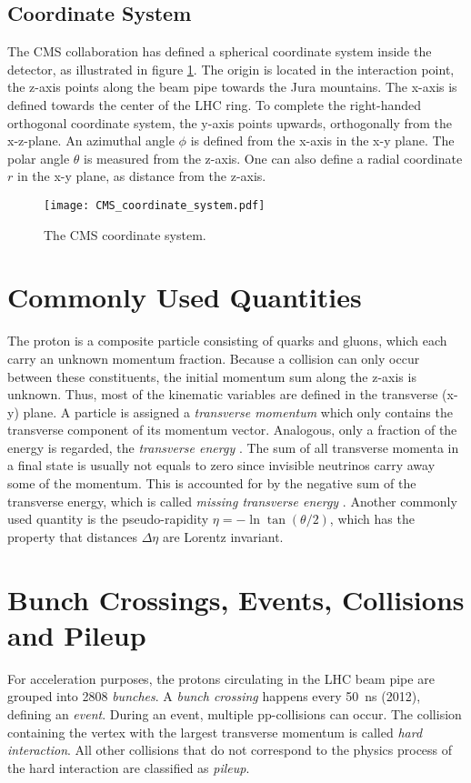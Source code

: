 \subsection{Coordinate System}
The CMS collaboration has defined a spherical coordinate system inside the detector, as illustrated in figure \ref{fig:cms_coordinate_system}. The origin is located in the interaction point, the z-axis points along the beam pipe towards the Jura mountains. The x-axis is defined towards the center of the LHC ring. To complete the right-handed orthogonal coordinate system, the y-axis points upwards, orthogonally from the x-z-plane. 
An azimuthal angle $\phi$ is defined from the x-axis in the x-y plane. The polar angle $\theta$ is measured from the z-axis. One can also define a radial coordinate $r$ in the x-y plane, as distance from the z-axis.\cite[p.~2]{Co2008CMS} 
\begin{figure}
	\centering
	\texttt{[image: CMS\_coordinate\_system.pdf]}
	\caption{The CMS coordinate system.}
	\label{fig:cms_coordinate_system}
\end{figure}

\section{Commonly Used Quantities}
The proton is a composite particle consisting of quarks and gluons, which each carry an unknown momentum fraction. Because a collision can only occur between these constituents, the initial momentum sum along the z-axis is unknown.
Thus, most of the kinematic variables are defined in the transverse (x-y) plane. A particle is assigned a \emph{transverse momentum} \pT which only contains the transverse component of its momentum vector. Analogous, only a fraction of the energy is regarded, the \emph{transverse energy} \ET. 
The sum of all transverse momenta in a final state is usually not equals to zero since invisible neutrinos carry away some of the momentum. This is accounted for by the negative sum of the transverse energy, which is called \emph{missing transverse energy} \MET.
Another commonly used quantity is the pseudo-rapidity $\eta = -\ln \tan(\theta/2)$, which has the property that distances $\Delta\eta$ are Lorentz invariant.

\section{Bunch Crossings, Events, Collisions and Pileup}
For acceleration purposes, the protons circulating in the LHC beam pipe are grouped into 2808 \emph{bunches}\cite[p.~4]{EB2008LHC}. A \emph{bunch crossing} happens every \SI{50}{\nano\second} (2012), defining an \emph{event}. During an event, multiple pp-collisions can occur. The collision containing the vertex with the largest transverse momentum is called \emph{hard interaction}. All other collisions that do not correspond to the physics process of the hard interaction are classified as \emph{pileup}.

